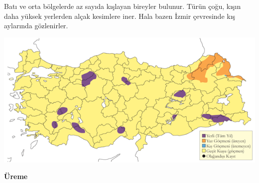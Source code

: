 \documentclass[
  letterpaper,
  DIV=11,
  numbers=noendperiod]{scrreprt}
\begin{document}
Batı ve orta bölgelerde az sayıda kışlayan bireyler bulunur. Türün çoğu,
kışın daha yüksek yerlerden alçak kesimlere iner. Hala bazen İzmir
çevresinde kış aylarında gözlenirler.

\includegraphics{images/harita_Page_087.png}

\textbf{Üreme}
\end{document}
